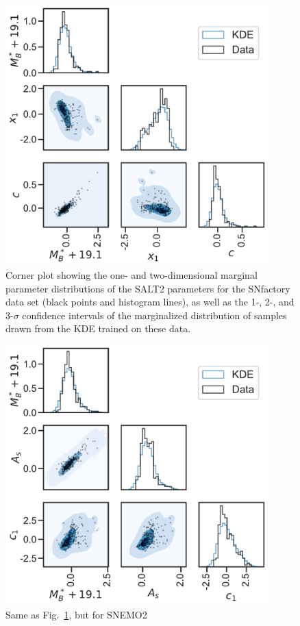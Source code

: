 \begin{figure}
    \centering
\includegraphics[width=0.9\textwidth]{figures/snemo_kde/salt2_blob_corner.pdf}
    \caption{Corner plot showing the one- and two-dimensional marginal parameter distributions of the SALT2 parameters for the SNfactory data set (black points and histogram lines), as well as the 1-, 2-, and 3-$\sigma$ confidence intervals of the marginalized distribution of samples drawn from the KDE trained on these data.}
    \label{fig:salt2_sample}
\end{figure}

\begin{figure}
    \centering
\includegraphics[width=0.9\textwidth]{figures/snemo_kde/snemo2_blob_corner.pdf}
    \caption{Same as Fig.~\ref{fig:salt2_sample}, but for SNEMO2}
    \label{fig:snemo2_sample}
\end{figure}

